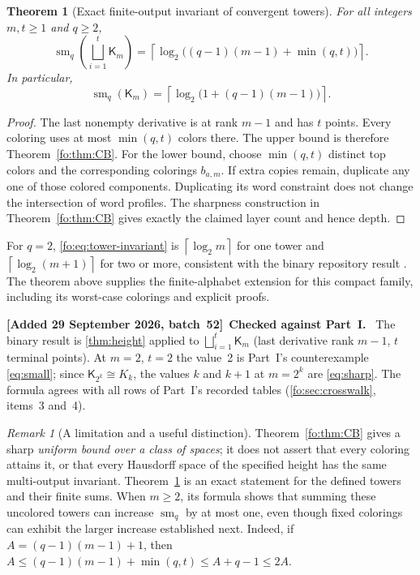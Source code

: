 \documentclass[11pt,letterpaper]{article}
\numberwithin{equation}{section}
\newtheorem{theorem}{Theorem}[section]
\theoremstyle{definition}
\theoremstyle{remark}
\newtheorem{remark}[remark]{Remark}
\theoremstyle{definition}
\newcommand{\ceil}[1]{\left\lceil#1\right\rceil}
\newcommand{\smq}{\operatorname{sm}_{q}}
\newcommand{\Tw}{\mathsf K}
\newenvironment{writenote}[1][]{\par\smallskip\begingroup\small\sloppy
 \noindent\textbf{[Added 29 September 2026, batch~52]}\if\relax\detokenize{#1}\relax\else~\textbf{#1.}\fi\ }%
 {\par\endgroup\smallskip}
\begin{document}
\begin{theorem}[Exact finite-output invariant of convergent towers]
\label{fo:thm:tower-invariant}
For all integers $m,t\ge1$ and $q\ge2$,
\begin{equation}\label{fo:eq:tower-invariant}
 \boxed{\displaystyle
 \smq\!\left(\bigsqcup_{i=1}^{t}\Tw_m\right)
 =\ceil{\log_2\bigl((q-1)(m-1)+\min(q,t)\bigr)}.}
\end{equation}
In particular,
\begin{equation}\label{fo:eq:one-tower}
 \smq(\Tw_m)=\ceil{\log_2\bigl(1+(q-1)(m-1)\bigr)}.
\end{equation}
\end{theorem}
\begin{proof}
The last nonempty derivative is at rank $m-1$ and has $t$ points. Every coloring
uses at most $\min(q,t)$ colors there. The upper bound is therefore
Theorem~\ref{fo:thm:CB}. For the lower bound, choose $\min(q,t)$ distinct top
colors and the corresponding colorings $b_{a,m}$. If extra copies remain,
duplicate any one of those colored components. Duplicating its word constraint
does not change the intersection of word profiles. The sharpness construction
in Theorem~\ref{fo:thm:CB} gives exactly the claimed layer count and hence depth.
\end{proof}

For $q=2$, \eqref{fo:eq:tower-invariant} is
$\ceil{\log_2m}$ for one tower and $\ceil{\log_2(m+1)}$ for two or more,
consistent with the binary repository result \cite{Repo}. The theorem above
supplies the finite-alphabet extension for this compact family, including its
worst-case colorings and explicit proofs.

\begin{writenote}[Checked against Part~I]
The binary result is \cref{thm:height} applied to $\bigsqcup_{i=1}^t\Tw_m$
(last derivative rank $m-1$, $t$ terminal points). At $m=2$, $t=2$ the value~2
is Part~I's counterexample \eqref{eq:small}; since $\Tw_{2^k}\cong K_k$, the
values $k$ and $k+1$ at $m=2^k$ are \eqref{eq:sharp}. The formula agrees with
all rows of Part~I's recorded tables (\cref{fo:sec:crosswalk}, items~3 and~4).
\end{writenote}

\begin{remark}[A limitation and a useful distinction]
Theorem~\ref{fo:thm:CB} gives a sharp \emph{uniform bound over a class of spaces};
it does not assert that every coloring attains it, or that every Hausdorff
space of the specified height has the same multi-output invariant.
Theorem~\ref{fo:thm:tower-invariant} is an exact statement for the defined towers
and their finite sums. When $m\ge2$, its formula shows that summing these
uncolored towers can increase $\smq$ by at most one, even though fixed
colorings can exhibit the larger increase established next.
Indeed, if $A=(q-1)(m-1)+1$, then
$A\le(q-1)(m-1)+\min(q,t)\le A+q-1\le2A$.
\end{remark}
\end{document}
